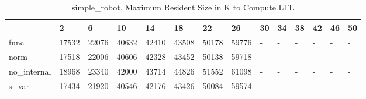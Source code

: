 \begin{table}
\caption{simple_robot, Maximum Resident Size in K to Compute LTL}
\label{simple_robot_LTL_size}
\begin{tabular}{llllllllllllll}
\toprule
 & 2 & 6 & 10 & 14 & 18 & 22 & 26 & 30 & 34 & 38 & 42 & 46 & 50 \\
\midrule
func & 17532 & 22076 & 40632 & 42410 & 43508 & 50178 & 59776 & - & - & - & - & - & - \\
norm & 17518 & 22006 & 40606 & 42328 & 43452 & 50138 & 59718 & - & - & - & - & - & - \\
no_internal & 18968 & 23340 & 42000 & 43714 & 44826 & 51552 & 61098 & - & - & - & - & - & - \\
s_var & 17434 & 21920 & 40546 & 42176 & 43426 & 50084 & 59574 & - & - & - & - & - & - \\
\bottomrule
\end{tabular}
\end{table}
